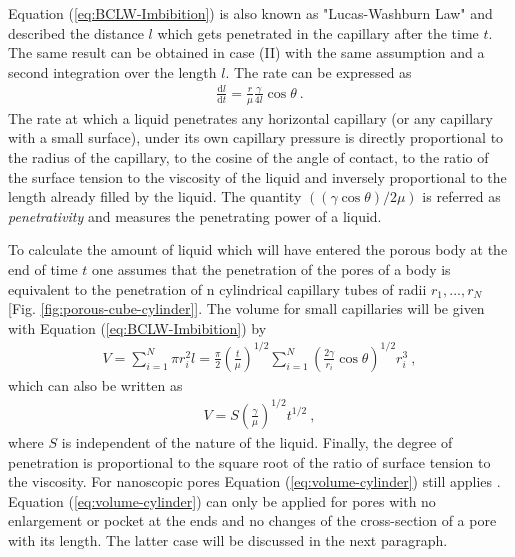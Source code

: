 \documentclass[aip, amsmath, amssymb, reprint, twocolumn, floatfix]{revtex4-1}
\newcommand{\dldt}{\frac{\mathrm{d}l}{\mathrm{d}t}}
\begin{document}
Equation (\ref{eq:BCLW-Imbibition}) is also known as "Lucas-Washburn Law" and described the distance $l$ which gets penetrated in the capillary after the time $t$. The same result can be obtained in case (II) with the same assumption and a second integration over the length $l$. The rate can be expressed as
\begin{gather}
	\boxed{\dldt = \frac{r}{\mu} \frac{\gamma}{4l} \cos \theta}~.
	\label{eq:rate}
\end{gather}
The rate at which a liquid penetrates any horizontal capillary (or any capillary with a small surface), under its own capillary pressure is directly proportional to the radius of the capillary, to the cosine of the angle of contact, to the ratio of the surface tension to the viscosity of the liquid and inversely proportional to the length already filled by the liquid. The quantity $((\gamma \cos \theta)/2 \mu)$ is referred as \textit{penetrativity} and measures the penetrating power of a liquid. 
\bigskip

\begin{center}
	\captionsetup{type=figure}
	
	\label{fig:porous-cube-cylinder}
\end{center}

To calculate the amount of liquid which will have entered the porous body at the end of time $t$ one assumes that the penetration of the pores of a body is equivalent to the penetration of n cylindrical capillary tubes of radii ${r_1,...,r_N}$ [Fig. \ref{fig:porous-cube-cylinder}]. The volume for small capillaries will be given with Equation (\ref{eq:BCLW-Imbibition}) by
\begin{gather}
	V = \sum_{i=1}^N \pi r_i^2 l = \frac{\pi}{2} \left(\frac{t}{\mu}\right)^{1/2} \sum_{i=1}^N \left(\frac{2 \gamma}{r_i}\cos\theta \right)^{1/2} r_i^3~,
\end{gather}
which can also be written as
\begin{gather}
	\boxed{V = S \left(\frac{\gamma}{\mu}\right)^{1/2} t^{1/2}}~, 
	\label{eq:volume-cylinder}
\end{gather}
where $S$ is independent of the nature of the liquid. Finally, the degree of penetration is proportional to the square root of the ratio of surface tension to the viscosity. For nanoscopic pores Equation (\ref{eq:volume-cylinder}) still applies \cite{Dimitrov2007,Gruener2009a,Gruener2009b}. Equation (\ref{eq:volume-cylinder}) can only be applied for pores with no enlargement or pocket at the ends and no changes of the cross-section of a pore with its length. The latter case will be discussed in the next paragraph.
\end{document}
